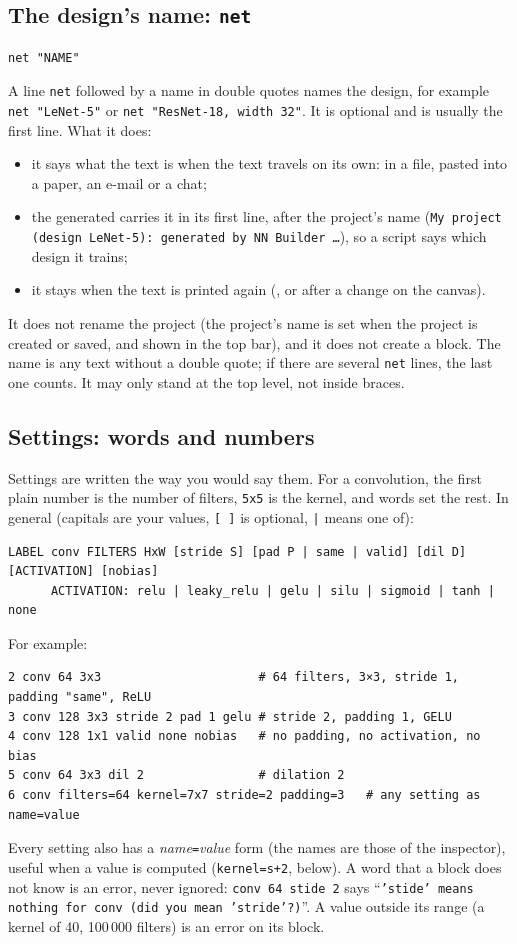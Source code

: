 \subsection{The design's name: \texttt{net}}
\label{sec:text-net}
\begin{Verbatim}[fontsize=\small]
net "NAME"
\end{Verbatim}
A line \texttt{net} followed by a name in double quotes names the design, for example \texttt{net "LeNet-5"} or
\texttt{net "ResNet-18, width 32"}. It is optional and is usually the first line. What it does:
\begin{itemize}[nosep]
  \item it says what the text is when the text travels on its own: in a  file, pasted into a paper, an e-mail or a chat;
  \item the generated  carries it in its first line, after the project's name (\texttt{My project (design LeNet-5):
        generated by NN Builder \dots}), so a script says which design it trains;
  \item it stays when the text is printed again (, or after a change on the canvas).
\end{itemize}
It does not rename the project (the project's name is set when the project is created or saved, and shown in the top bar), and it does
not create a block. The name is any text without a double quote; if there are several \texttt{net} lines, the last one counts. It may
only stand at the top level, not inside braces.

\subsection{Settings: words and numbers}
Settings are written the way you would say them. For a convolution, the first plain number is the number of filters, \texttt{5x5} is
the kernel, and words set the rest. In general (capitals are your values, \mbox{\texttt{[ ]}} is optional, \texttt{|} means one of):

\begin{Verbatim}[fontsize=\small]
LABEL conv FILTERS HxW [stride S] [pad P | same | valid] [dil D] [ACTIVATION] [nobias]
      ACTIVATION: relu | leaky_relu | gelu | silu | sigmoid | tanh | none
\end{Verbatim}
For example:
\begin{verbatim}
2 conv 64 3x3                      # 64 filters, 3×3, stride 1, padding "same", ReLU
3 conv 128 3x3 stride 2 pad 1 gelu # stride 2, padding 1, GELU
4 conv 128 1x1 valid none nobias   # no padding, no activation, no bias
5 conv 64 3x3 dil 2                # dilation 2
6 conv filters=64 kernel=7x7 stride=2 padding=3   # any setting as name=value
\end{verbatim}
Every setting also has a \emph{name}\texttt{=}\emph{value} form (the names are those of the inspector), useful when a value is computed
(\texttt{kernel=s+2}, below). A word that a block does not know is an error, never ignored: \texttt{conv 64 stide 2} says
``\texttt{'stide' means nothing for conv (did you mean 'stride'?)}''. A value outside its range (a kernel of 40, 100\,000 filters) is an
error on its block.

